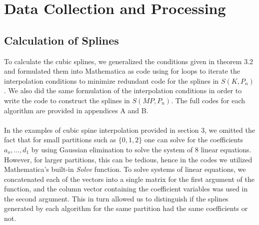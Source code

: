\chapter{Data Collection and Processing}
\label{chapter4}
\thispagestyle{empty}

\section{Calculation of Splines}
To calculate the cubic splines, we generalized the conditions given in theorem 3.2 and formulated them into Mathematica as code using for loops to iterate the interpolation conditions to minimize redundant code for the splines in $S(K, P_{n})$. We also did the same formulation of the interpolation conditions in order to write the code to construct the splines in $S(MP, P_{n})$. The full codes for each algorithm are provided in appendices A and B.\\\\
In the examples of cubic spine interpolation provided in section 3, we omitted the fact that for small partitions such as $\{0,1,2\}$ one can solve for the coefficients $a_{o},...,d_{1}$ by using Gaussian elimination to solve the system of $8$ linear equations. However, for larger partitions, this can be tedious, hence in the codes we utilized Mathematica's built-in \emph{Solve} function. To solve systems of linear equations, we concatenated each of the vectors into a single matrix for the first argument of the function, and the column vector containing the coefficient variables was used in the second argument. This in turn allowed us to distinguish if the splines generated by each algorithm for the same partition had the same coefficients or not.
